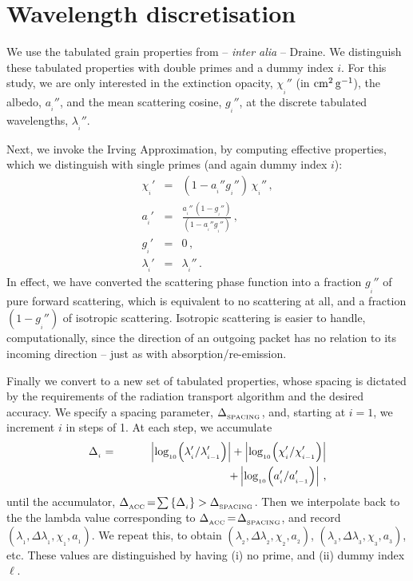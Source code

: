 \documentclass[usenatbib]{mn2e}
\numberwithin{equation}{section}
\begin{document}
\vspace{0.5cm}





\section{Wavelength discretisation}\label{SEC:WavelengthDiscretisation}

We use the tabulated grain properties from -- {\it inter alia} -- Draine. We distinguish these tabulated properties with double primes and a dummy index $i$. For this study, we are only interested in the extinction opacity, $\chi_{_i}''$ (in ${\rm cm}^2\,{\rm g}^{-1}$), the albedo, $a_{_i}''$, and the mean scattering cosine, $g_{_i}''$, at the discrete tabulated wavelengths, $\lambda_{_i}''$.

Next, we invoke the Irving Approximation, by computing effective properties, which we distinguish with single primes (and again dummy index $i$):
\begin{eqnarray}
\chi_{_i}'&=&(1-a_{_i}''g_{_i}'')\,\chi_{_i}''\,,\\
a_{_i}'&=&\frac{a_{_i}''\,(1-g_{_i}'')}{(1-a_{_i}''g_{_i}'')}\,,\\
g_{_i}'&=&0\,,\\
\lambda_{_i}'&=&\lambda_{_i}''\,.
\end{eqnarray}
In effect, we have converted the scattering phase function into a fraction $g_{_i}''$ of pure forward scattering, which is equivalent to no scattering at all, and a fraction $(1-g_{_i}'')$ of isotropic scattering. Isotropic scattering is easier to handle, computationally, since the direction of an outgoing packet has no relation to its incoming direction -- just as with absorption/re-emission.

Finally we convert to a new set of tabulated properties, whose spacing is dictated by the requirements of the radiation transport algorithm and the desired accuracy. We specify a spacing parameter, $\Delta_{_{\rm SPACING}}$, and, starting at $i\!=\!1$, we increment $i$ in steps of 1. At each step, we accumulate 
\begin{eqnarray}\nonumber
\Delta_{_i}&=&\left|\log_{_{10}}\!\left(\lambda'_{_i}/\lambda'_{_{i-1}}\right)\right|+\left|\log_{_{10}}\!\left(\chi'_{_i}/\chi'_{_{i-1}}\right)\right|\\
&&\hspace{3.3cm}+\left|\log_{_{10}}\!\left(a'_{_i}/a'_{_{i-1}}\right)\right|\,,
\end{eqnarray}
until the accumulator, $\Delta_{_{\rm ACC}}\!=\!\sum\left\{\Delta_{_i}\right\}>\Delta_{_{\rm SPACING}}$. Then we interpolate back to the the lambda value corresponding to $\Delta_{_{\rm ACC}}\!=\!\Delta_{_{\rm SPACING}}$, and record $(\lambda_{_1},\Delta\lambda_{_1},\chi_{_1},a_{_1})$. We repeat this, to obtain $(\lambda_{_2},\Delta\lambda_{_2},\chi_{_2},a_{_2})$, $(\lambda_{_3},\Delta\lambda_{_3},\chi_{_3},a_{_3})$, etc. These values are distinguished by having (i) no prime, and (ii) dummy index $\ell$.
\end{document}
